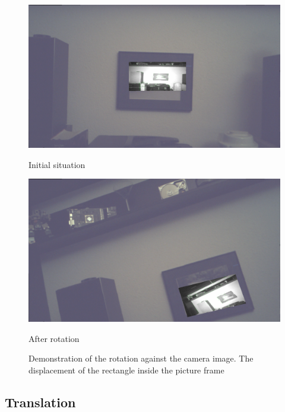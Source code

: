 \begin{figure}[H]
  \centering
  \begin{minipage}[b]{0.47\textwidth}
    \includegraphics[scale=0.1115]{images/demo_rotation_init.png}
    \caption{Initial situation}
    \label{fig:rotation_demo_init} 
  \end{minipage} %
  \begin{minipage}[b]{0.47\textwidth}
    \includegraphics[scale=0.1115]{images/demo_rotation_rotated.png} 
    \caption{After rotation}
    \label{fig:rotation_demo_rotated} 
  \end{minipage}
  \caption{Demonstration of the rotation against the camera image. The displacement of the rectangle inside the picture frame }
  \label{fig:rotation_demo}
\end{figure}
\subsection{Translation}
\label{sec:kalman_translation_results}
